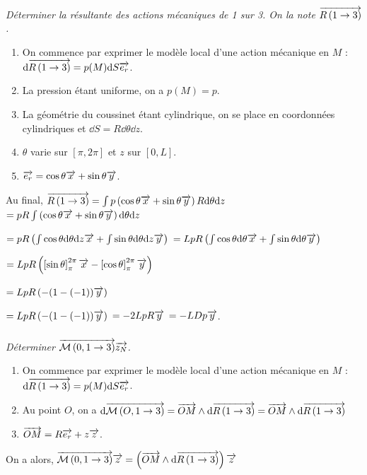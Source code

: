 \documentclass[10pt,fleqn]{article} %
\begin{document}
\begin{multicols}{2}
\begin{multicols}{2}
\subparagraph{}\textit{Déterminer la résultante des actions mécaniques de 1 sur 3. On la note $\overrightarrow{R\left( {1} \rightarrow {3}\right)}$.}
\ifprof
\begin{corrige}
\begin{enumerate}
\item On commence par exprimer le modèle local d'une action mécanique en $M$ : $\text{d} \overrightarrow{R\left( {1} \rightarrow {3}\right)} = p(M) \text{d} S \overrightarrow{e_r}$.
\item La pression étant uniforme, on a $p(M)=p$.
\item La géométrie du coussinet étant cylindrique, on se place en coordonnées cylindriques et $\dd S = R\dd \theta \dd z$.  
\item $\theta$ varie sur $[\pi, 2\pi]$ et $z$ sur $[0,L]$. 
\item $\overrightarrow{e_r}=\cos\theta\overrightarrow{x}+\sin\theta\overrightarrow{y}$.
\end{enumerate}
Au final, $\overrightarrow{R\left( {1} \rightarrow {3}\right)}=\int p  \left( \cos\theta\overrightarrow{x}+\sin\theta\overrightarrow{y}\right)R\text{d} \theta \text{d} z$
$=pR\int \left( \cos\theta\overrightarrow{x}+\sin\theta\overrightarrow{y}\right)\text{d} \theta \text{d} z$

$=pR\left( \int  \cos\theta\text{d} \theta \text{d} z \overrightarrow{x}+\int \sin\theta\text{d} \theta \text{d} z   \overrightarrow{y}\right)$
$=LpR\left( \int  \cos\theta\text{d} \theta  \overrightarrow{x}+\int \sin\theta\text{d} \theta   \overrightarrow{y}\right)$

$=LpR\left( \left[ \sin \theta \right]^{2\pi}_{\pi}  \overrightarrow{x}-\left[\cos \theta \right]^{2\pi}_{\pi}   \overrightarrow{y}\right)$

$=LpR\left( -(1-(-1))   \overrightarrow{y}\right)$

$=LpR\left( -(1-(-1))   \overrightarrow{y}\right)$ $=-2LpR   \overrightarrow{y}$ $=-LDp   \overrightarrow{y}$.

\end{corrige}
\else
\fi


\subparagraph{}\textit{Déterminer $\overrightarrow{\mathcal{M}\left( {0}, {1} \rightarrow {3}\right)}\overrightarrow{z_N}$.}
\ifprof
\begin{corrige}
\begin{enumerate}
\item On commence par exprimer le modèle local d'une action mécanique en $M$ : $\text{d} \overrightarrow{R\left( {1} \rightarrow {3}\right)} = p(M) \text{d} S \overrightarrow{e_r}$.
\item Au point $O$, on a $\text{d} \overrightarrow{\mathcal{M}\left( {O}, {1} \rightarrow {3}\right)}=\overrightarrow{OM}\wedge \text{d} \overrightarrow{R\left( {1} \rightarrow {3}\right)} =\overrightarrow{OM}\wedge \text{d} \overrightarrow{R\left( {1} \rightarrow {3}\right)} $
\item $\overrightarrow{OM}=R\overrightarrow{e_r}+z\overrightarrow{z}$.
\end{enumerate}
On a alors, $ \overrightarrow{\mathcal{M}\left( {0}, {1} \rightarrow {3}\right)}\overrightarrow{z} =\left( \overrightarrow{OM}\wedge \text{d} \overrightarrow{R\left( {1} \rightarrow {3}\right)}\right) \overrightarrow{z}$


\end{corrige}
\end{multicols}
\end{multicols}
\end{document}
